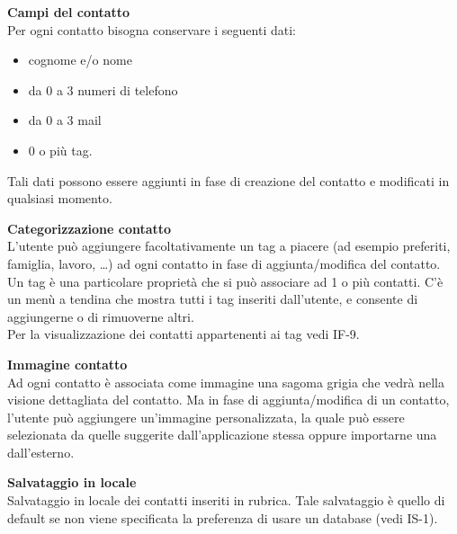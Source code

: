 \newcommand{\DFitem}{\addtocounter{DFcounter}{1}DF-\theDFcounter}
\begin{tcolorbox}[colback=white,colframe=black!80!white,title=\textbf{Esigenze dei dati e informazioni DF}]
	\begin{itemize}[itemsep=2pt, topsep=0pt, label=\textbf{\DFitem}]
		\item \textbf{Campi del contatto}
		\\Per ogni contatto bisogna conservare i seguenti dati:
		\begin{itemize}[noitemsep, topsep=0pt, label=$\bullet$]
			\item cognome e/o nome
			\item da 0 a 3 numeri di telefono
			\item da 0 a 3 mail 
			\item 0 o più tag.
		\end{itemize}
		Tali dati possono essere aggiunti in fase di creazione del contatto e modificati in qualsiasi momento.
		
		\item \textbf{Categorizzazione contatto}
		\\L’utente può aggiungere facoltativamente un tag a piacere (ad esempio preferiti, famiglia, lavoro, …) ad ogni contatto in fase di aggiunta/modifica del contatto.
		\\Un tag è una particolare proprietà che si può associare ad 1 o più contatti.
		C’è un menù a tendina che mostra tutti i tag inseriti dall’utente, e consente di aggiungerne o di rimuoverne altri. 
		\\Per la visualizzazione dei contatti appartenenti ai tag vedi IF-9.
		
		\item \textbf{Immagine contatto}
		\\Ad ogni contatto è associata come immagine una sagoma grigia che vedrà nella visione dettagliata del contatto. Ma in fase di aggiunta/modifica di un contatto, l’utente può aggiungere un’immagine personalizzata, la quale può essere selezionata da quelle suggerite dall’applicazione stessa oppure importarne una dall’esterno.
		
		\item \textbf{Salvataggio in locale}
		\\Salvataggio in locale dei contatti inseriti in rubrica. Tale salvataggio è quello di default se non viene specificata la preferenza di usare un database (vedi IS-1).
		
	\end{itemize}
\end{tcolorbox}

